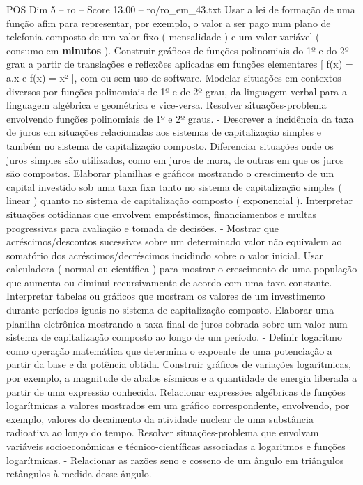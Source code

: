 \begin{textsample}{POS Dim 5 – ro – Score 13.00 – ro/ro\_em\_43.txt}
Usar a lei de formação de uma função afim para representar, por exemplo, o valor a ser pago num plano de telefonia composto de um valor fixo ( mensalidade ) e um valor variável ( consumo em \textbf{minutos} ).
Construir gráficos de funções polinomiais do 1º e do 2º grau a partir de translações e reflexões aplicadas em funções elementares [ f(x) = a.x e f(x) = x² ], com ou sem uso de software.
Modelar situações em contextos diversos por funções polinomiais de 1º e de 2º grau, da linguagem verbal para a linguagem algébrica e geométrica e vice-versa.
Resolver situações-problema envolvendo funções polinomiais de 1º e 2º graus. - Descrever a incidência da taxa de juros em situações relacionadas aos sistemas de capitalização simples e também no sistema de capitalização composto.
Diferenciar situações onde os juros simples são utilizados, como em juros de mora, de outras em que os juros são compostos.
Elaborar planilhas e gráficos mostrando o crescimento de um capital investido sob uma taxa fixa tanto no sistema de capitalização simples ( linear ) quanto no sistema de capitalização composto ( exponencial ).
Interpretar situações cotidianas que envolvem empréstimos, financiamentos e multas progressivas para avaliação e tomada de decisões. - Mostrar que acréscimos/descontos sucessivos sobre um determinado valor não equivalem ao somatório dos acréscimos/decréscimos incidindo sobre o valor inicial.
Usar calculadora ( normal ou científica ) para mostrar o crescimento de uma população que aumenta ou diminui recursivamente de acordo com uma taxa constante.
Interpretar tabelas ou gráficos que mostram os valores de um investimento durante períodos iguais no sistema de capitalização composto.
Elaborar uma planilha eletrônica mostrando a taxa final de juros cobrada sobre um valor num sistema de capitalização composto ao longo de um período. - Definir logaritmo como operação matemática que determina o expoente de uma potenciação a partir da base e da potência obtida.
Construir gráficos de variações logarítmicas, por exemplo, a magnitude de abalos sísmicos e a quantidade de energia liberada a partir de uma expressão conhecida.
Relacionar expressões algébricas de funções logarítmicas a valores mostrados em um gráfico correspondente, envolvendo, por exemplo, valores do decaimento da atividade nuclear de uma substância radioativa ao longo do tempo.
Resolver situações-problema que envolvam variáveis socioeconômicas e técnico-científicas associadas a logaritmos e funções logarítmicas. - Relacionar as razões seno e cosseno de um ângulo em triângulos retângulos à medida desse ângulo.

\end{textsample}
